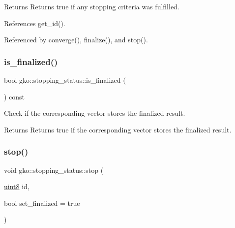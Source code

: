\begin{DoxyReturn}{Returns}
Returns true if any stopping criteria was fulfilled. 
\end{DoxyReturn}


References get\+\_\+id().



Referenced by converge(), finalize(), and stop().

\mbox{\label{classgko_1_1stopping__status_a7c8b094d37449098ca4ddb1f4bbf10bd}} 
\subsubsection{\texorpdfstring{is\+\_\+finalized()}{is\_finalized()}}
{\footnotesize\ttfamily bool gko\+::stopping\+\_\+status\+::is\+\_\+finalized (\begin{DoxyParamCaption}{ }\end{DoxyParamCaption}) const\hspace{0.3cm}{\ttfamily [noexcept]}}



Check if the corresponding vector stores the finalized result. 

\begin{DoxyReturn}{Returns}
Returns true if the corresponding vector stores the finalized result. 
\end{DoxyReturn}
\mbox{\label{classgko_1_1stopping__status_ab13d4f214328c9574fdef6168c671de0}} 
\subsubsection{\texorpdfstring{stop()}{stop()}}
{\footnotesize\ttfamily void gko\+::stopping\+\_\+status\+::stop (\begin{DoxyParamCaption}\item[{\hyperlink{namespacegko_a3950fc3732811a8563484e5098c31531}{uint8}}]{id,  }\item[{bool}]{set\+\_\+finalized = {\ttfamily true} }\end{DoxyParamCaption})\hspace{0.3cm}{\ttfamily [noexcept]}}



